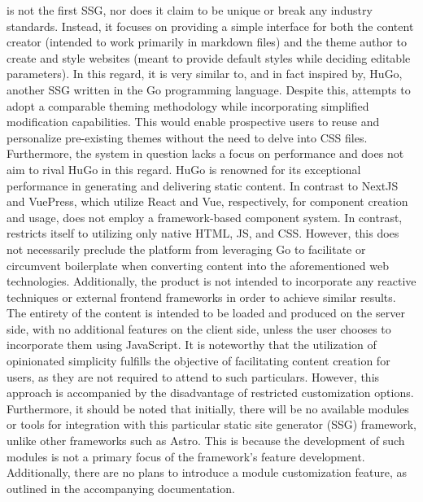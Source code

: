 \markdownRendererDocumentBegin
{}\markdownRendererInterblockSeparator
{}\markdownRendererInterblockSeparator
{} is not the first SSG, nor does it claim to be unique or break any industry standards. Instead, it focuses on providing a simple interface for both the content creator (intended to work primarily in markdown files) and the theme author to create and style websites (meant to provide default styles while deciding editable parameters).\markdownRendererInterblockSeparator
{}In this regard, it is very similar to, and in fact inspired by, HuGo, another SSG written in the Go programming language. Despite this,  attempts to adopt a comparable theming methodology while incorporating simplified modification capabilities. This would enable prospective users to reuse and personalize pre-existing themes without the need to delve into CSS files. Furthermore, the system in question lacks a focus on performance and does not aim to rival HuGo in this regard. HuGo is renowned for its exceptional performance in generating and delivering static content.\markdownRendererInterblockSeparator
{}In contrast to NextJS and VuePress, which utilize React and Vue, respectively, for component creation and usage,  does not employ a framework-based component system. In contrast,  restricts itself to utilizing only native HTML, JS, and CSS. However, this does not necessarily preclude the platform from leveraging Go to facilitate or circumvent boilerplate when converting content into the aforementioned web technologies.\markdownRendererInterblockSeparator
{}Additionally, the product is not intended to incorporate any reactive techniques or external frontend frameworks in order to achieve similar results. The entirety of the content is intended to be loaded and produced on the server side, with no additional features on the client side, unless the user chooses to incorporate them using JavaScript. It is noteworthy that the utilization of opinionated simplicity fulfills the objective of facilitating content creation for users, as they are not required to attend to such particulars. However, this approach is accompanied by the disadvantage of restricted customization options.\markdownRendererInterblockSeparator
{}Furthermore, it should be noted that initially, there will be no available modules or tools for integration with this particular static site generator (SSG) framework, unlike other frameworks such as Astro. This is because the development of such modules is not a primary focus of the framework's feature development. Additionally, there are no plans to introduce a module customization feature, as outlined in the accompanying documentation.\markdownRendererInterblockSeparator

